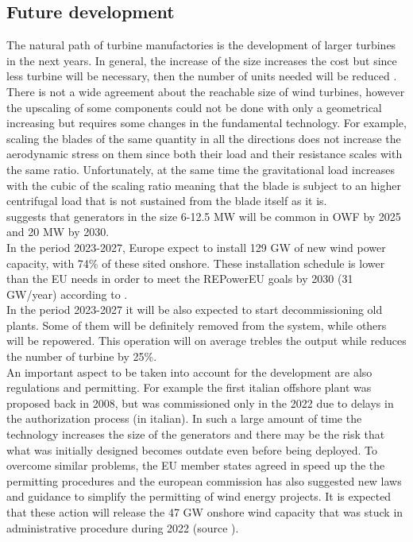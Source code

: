 \subsection{Future development}
The natural path of turbine manufactories is the development of larger turbines in the next years. In general, the increase of the size increases the cost but since less turbine will be necessary, then the number of units needed will be reduced \cite{current_staus_and_future_trends_of_offshore_wind_power_in_europe}.\\
There is not a wide agreement about the reachable size of wind turbines, however the upscaling of some components could not be done with only a geometrical increasing but requires some changes in the fundamental technology. For example, scaling the blades of the same quantity in all the directions does not increase the aerodynamic stress on them since both their load and their resistance scales with the same ratio. Unfortunately, at the same time the gravitational load increases with the cubic of the scaling ratio meaning that the blade is subject to an higher centrifugal load that is not sustained from the blade itself as it is. \\
\cite{current_staus_and_future_trends_of_offshore_wind_power_in_europe} suggests that generators in the size 6-12.5 MW will be common in OWF by 2025 and 20 MW by 2030.\\
In the period 2023-2027, Europe expect to install 129 GW of new wind power capacity, with 74\% of these sited onshore. These installation schedule is lower than the EU needs in order to meet the REPowerEU goals by 2030 (31 GW/year) according to \cite{wind_europe_data_2022}. \\
In the period 2023-2027 it will be also expected to start decommissioning old plants. Some of them will be definitely removed from the system, while others will be repowered. This operation will on average trebles the output while reduces the number of turbine by 25\%. \\
An important aspect to be taken into account for the development are also regulations and permitting. For example the first italian offshore plant was proposed back in 2008, but was commissioned only in the 2022 due to delays in the authorization process \cite{il_post} (in italian). In such a large amount of time the technology increases the size of the generators and there may be the risk that what was initially designed becomes outdate even before being deployed. To overcome similar problems, the EU member states agreed in speed up the the permitting procedures and the european commission has also suggested new laws and guidance to simplify the permitting of wind energy projects. It is expected that these action will release the 47 GW onshore wind capacity that was stuck in administrative procedure during 2022 (source \cite{wind_europe_data_2022}).  